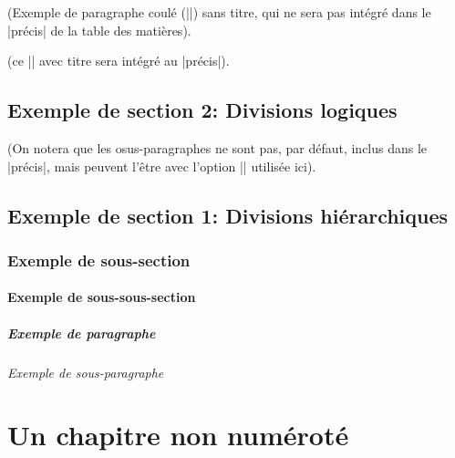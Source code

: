 \documentclass[precis,colourall,vgrid]{frenchlaw}
\begin{document}
\para (Exemple de paragraphe coulé (|\para|) sans titre, qui ne sera pas intégré dans le |précis| de la table des matières).

 (ce |\para| avec titre sera intégré au |précis|).

\section{Exemple de section 2: Divisions logiques}

 \lipsum[1]

 \lipsum[2]

 (On notera que les osus-paragraphes ne sont pas, par défaut, inclus dans le |précis|, mais peuvent l'être avec l'option |\subprecis| utilisée ici).

 \lipsum[3]

 \lipsum[4]

\section{Exemple de section 1: Divisions hiérarchiques}

\subsection{Exemple de sous-section}

\subsubsection{Exemple de sous-sous-section}

\paragraph{Exemple de paragraphe}

\subparagraph{Exemple de sous-paragraphe}

\chapter*[Conclusion]{Un chapitre non numéroté}

\tableofcontents*
\end{document}
